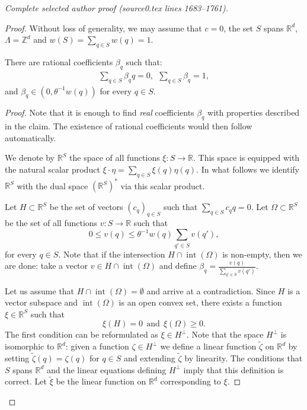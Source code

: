 \documentclass[10pt,a4paper]{amsart}
\newcommand{\R}{\mathbb R}
\newcommand{\Z}{\mathbb Z}
\renewcommand{\ge}{\geqslant}
\renewcommand{\le}{\leqslant}
\begin{document}
\par\medskip\noindent\textit{Complete selected author proof (source0.tex lines 1683--1761).}\par\smallskip
\begin{proof}
Without loss of generality, we may assume that $c = 0$, the set $S$ spans $\R^d$, $\Lambda = \Z^d$ and $w(S) = \sum_{q \in S} w(q) = 1$.

\begin{claim}\label{real}
There are rational coefficients $\beta_q$ such that:
\begin{align*}
    \sum_{q\in S} \beta_q q = 0,~~ \sum_{q \in S} \beta_q = 1, 
\end{align*}
and $\beta_q \in (0, \theta^{-1}w(q))$ for every $q\in S$.
\end{claim}
\begin{proof}

Note that it is enough to find {\em real} coefficients $\beta_q$ with properties described in the claim. The existence of rational coefficients would then follow automatically.

We denote by $\R^S$ the space of all functions $\xi: S \rightarrow \R$. This space is equipped with the natural scalar product $\xi \cdot \eta = \sum_{q \in S} \xi(q) \eta(q)$. In what follows we identify $\R^S$ with the dual space $(\R^S)^*$ via this scalar product.

Let $H \subset \R^S$ be the set of vectors $(c_q)_{q \in S}$ such that $\sum_{q \in S} c_q q = 0$. 
Let $\Omega \subset \R^S$ be the set of all functions $v: S \rightarrow \R$ such that 
$$
0 \le v(q) \le \theta^{-1}w(q) \sum_{q' \in S} v(q'),
$$
for every $q \in S$. Note that if the intersection $H \cap \operatorname{int}(\Omega)$ is non-empty, then we are done: take a vector $v \in H \cap \operatorname{int}(\Omega)$ and define $\beta_q = \frac{v(q)}{\sum_{q' \in S} v(q')}$.

Let us assume that $H \cap \operatorname{int}(\Omega) = \emptyset$ and arrive at a contradiction. Since $H$ is a vector subspace and $\operatorname{int}(\Omega)$ is an open convex set, there exists a function $\xi \in \R^S$ such that  
$$
\xi(H) = 0 ~~ {\text{and}} ~~\xi(\Omega) \ge 0.
$$
The first condition can be reformulated as $\xi \in H^\bot$.
Note that the space $H^\bot$ is isomorphic to $\R^d$: given a function $\zeta \in H^\bot$ we define a linear function $\tilde \zeta$ on $\R^d$ by setting $\tilde \zeta(q) = \zeta(q)$ for $q \in S$ and extending $\tilde \zeta$ by linearity. The conditions that $S$ spans $\R^d$ and the linear equations defining $H^{\bot}$ imply that this definition is correct. 
Let $\tilde \xi$ be the linear function on $\R^d$ corresponding to $\xi$.


\end{proof}
\end{proof}
\end{document}
